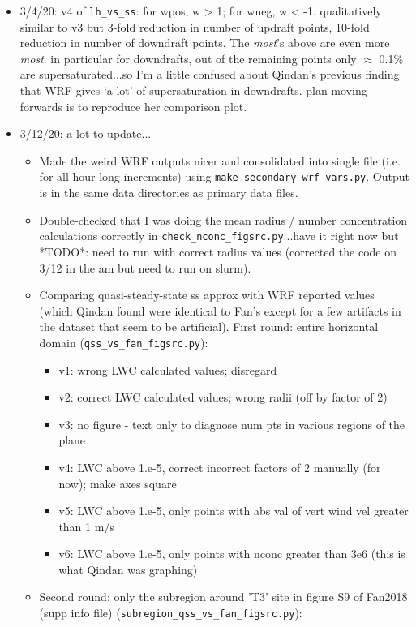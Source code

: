 \documentclass{article}
\begin{document}
\begin{itemize}
	\item 3/4/20: v4 of \texttt{lh\_vs\_ss}: for wpos, w > 1; for wneg, w < -1. qualitatively similar to v3 but 3-fold reduction in number of updraft points, 10-fold reduction in number of downdraft points. The \emph{most}'s above are even more \emph{most}. in particular for downdrafts, out of the remaining points only $\approx$ 0.1\% are supersaturated...so I'm a little confused about Qindan's previous finding that WRF gives `a lot' of supersaturation in downdrafts. plan moving forwards is to reproduce her comparison plot. 
	\item 3/12/20: a lot to update...
	\begin{itemize}
		\item Made the weird WRF outputs nicer and consolidated into single file (i.e. for all hour-long increments) using \texttt{make\_secondary\_wrf\_vars.py}. Output is in the same data directories as primary data files.
		\item Double-checked that I was doing the mean radius / number concentration calculations correctly in \texttt{check\_nconc\_figsrc.py}...have it right now but *TODO*: need to run with correct radius values (corrected the code on 3/12 in the am but need to run on slurm).
		\item Comparing quasi-steady-state ss approx with WRF reported values (which Qindan found were identical to Fan's except for a few artifacts in the dataset that seem to be artificial). First round: entire horizontal domain (\texttt{qss\_vs\_fan\_figsrc.py}): 
		\begin{itemize}
			\item v1: wrong LWC calculated values; disregard
			\item v2: correct LWC calculated values; wrong radii (off by factor of 2)
			\item v3: no figure - text only to diagnose num pts in various regions of the plane
			\item v4: LWC above 1.e-5, correct incorrect factors of 2 manually (for now); make axes square
			\item v5: LWC above 1.e-5, only points with abs val of vert wind vel greater than 1 m/s
			\item v6: LWC above 1.e-5, only points with nconc greater than 3e6 (this is what Qindan was graphing)
		\end{itemize}
		\item Second round: only the subregion around 'T3' site in figure S9 of Fan2018 (supp info file) (\texttt{subregion\_qss\_vs\_fan\_figsrc.py}):

\end{itemize}
\end{itemize}
\end{document}
